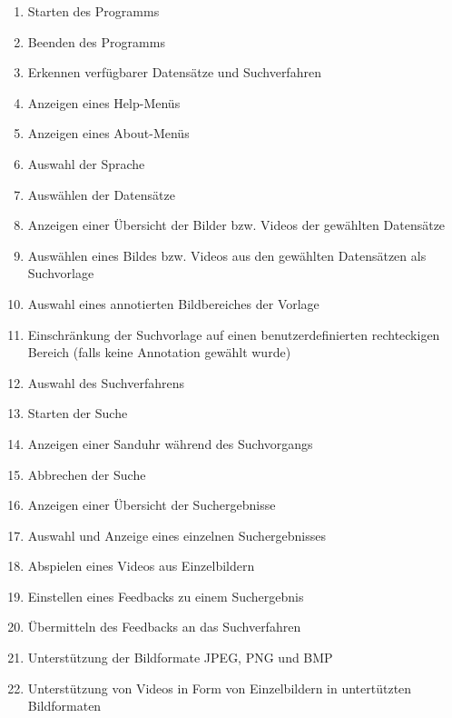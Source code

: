 \begin{enumerate} [label=\bfseries /F \arabic*0/]
	\subsection{Pflichtanforderungen}
	\item Starten des Programms
	\item Beenden des Programms
	\item Erkennen verfügbarer Datensätze und Suchverfahren
	\item Anzeigen eines Help-Menüs
	\item Anzeigen eines About-Menüs
	\item Auswahl der Sprache
	\newline
	\item Ausw\"ahlen der Datens\"atze
	\item Anzeigen einer Übersicht der Bilder bzw. Videos der gewählten Datensätze
	\item Ausw\"ahlen eines Bildes bzw. Videos aus den gewählten Datensätzen als Suchvorlage
	\item Auswahl eines annotierten Bildbereiches der Vorlage
	\item Einschränkung der Suchvorlage auf einen benutzerdefinierten rechteckigen Bereich (falls keine Annotation gewählt wurde)
	\item Auswahl des Suchverfahrens
	\newline
	\item Starten der Suche
	\item Anzeigen einer Sanduhr während des Suchvorgangs
	\item Abbrechen der Suche
	\newline
	\item Anzeigen einer \"Ubersicht der Suchergebnisse
	\item Auswahl und Anzeige eines einzelnen Suchergebnisses
	\item Abspielen eines Videos aus Einzelbildern
	\item Einstellen eines Feedbacks zu einem Suchergebnis
	\item \"Ubermitteln des Feedbacks an das Suchverfahren
	\newline
	\item Unterstützung der Bildformate JPEG, PNG und BMP
	\item Unterstützung von Videos in Form von Einzelbildern in untert\"utzten Bildformaten


\end{enumerate}
